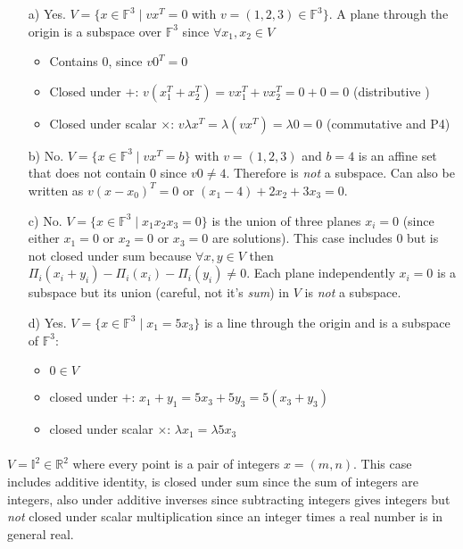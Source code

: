 \documentclass[11pt,notitlepage,oneside]{article}
\newcommand{\exo}[1]{%
\addtocontents{toc}{\protect\setcounter{tocdepth}{2}}%
\paragraph{#1}}
\begin{document}
\begin{enumerate}
\item[a)] Yes. $V=\{x\in\mathbb{F}^3\mid vx^T=0$ with $v=(1,2,3)\in \mathbb{F}^3 \}$. A plane through the origin is a subspace over $\mathbb{F}^3$ since $\forall x_1, x_2 \in V$
\begin{itemize}
\item Contains $0$, since $v0^T= 0$
\item Closed under $+$: $v(x_1^T + x_2^T) = vx_1^T + vx_2^T= 0+0 = 0$ (distributive )
\item Closed under scalar $\times$: $v \lambda x^T = \lambda (v x^T) = \lambda 0 = 0$  (commutative and P4)
\end{itemize}

\item[b)] No. $V=\{x\in\mathbb{F}^3\mid vx^T=b\}$ with  $v=(1,2,3)$ and $b=4$ is an affine set that does not contain $0$ since $v0\neq 4$. Therefore is \emph{not} a subspace. Can also be written as $v(x-x_0)^T = 0$ or $(x_1-4) + 2x_2 + 3x_3=0$.

\item[c)] No.  $V=\{x\in\mathbb{F}^3\mid x_1x_2x_3=0\}$ is the union of three planes $x_i=0$ (since either $x_1=0$ or $x_2=0$ or $x_3=0$ are solutions). 
This case includes $0$ but is not closed under sum because $\forall x,y\in V$ then $\Pi_i(x_i+y_i)-\Pi_i(x_i)-\Pi_i(y_i) \neq 0$. 
Each plane independently $x_i=0$  is a subspace but its union (careful, not it's \emph{sum}) in $V$ is \emph{not} a subspace.

\item[d)]Yes. $V=\{x\in\mathbb{F}^3\mid x_1=5x_3\}$ is a line through the origin and is a subspace of $\mathbb{F}^3$:
\begin{itemize}
\item $0\in V$
\item closed under $+$: $ x_1+y_1 = 5x_3+5y_3 = 5(x_3+y_3)$
\item closed under scalar $\times$: $\lambda x_1 = \lambda 5x_3$
\end{itemize}

\end{enumerate}
\exo{}
$V = \mathbb{I}^2 \in \mathbb{R}^2$ where every point is a pair of integers $x=(m,n)$. This case includes additive identity, is closed under sum since the sum of integers are integers, also under additive inverses since subtracting integers gives integers but \emph{not} closed under scalar multiplication since an integer times a real number is in general real.
\end{document}
